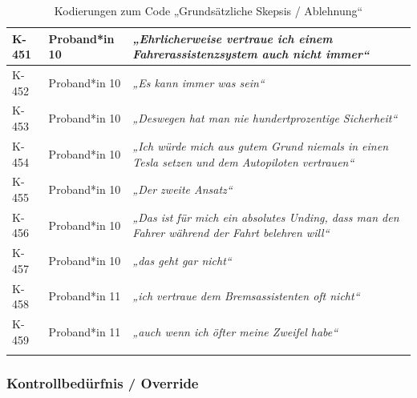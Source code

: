 {\begin{xltabular}{\textwidth}{
    |P{0.10\textwidth}
    |P{0.17\textwidth}
    |Y|
}
\hline
K-451 & Proband*in 10 & \textit{„Ehrlicherweise vertraue ich einem Fahrerassistenzsystem auch nicht immer“} \\
\hline
K-452 & Proband*in 10 & \textit{„Es kann immer was sein“} \\
\hline
K-453 & Proband*in 10 & \textit{„Deswegen hat man nie hundertprozentige Sicherheit“} \\
\hline
K-454 & Proband*in 10 & \textit{„Ich würde mich aus gutem Grund niemals in einen Tesla setzen und dem Autopiloten vertrauen“} \\
\hline
K-455 & Proband*in 10 & \textit{„Der zweite Ansatz“} \\
\hline
K-456 & Proband*in 10 & \textit{„Das ist für mich ein absolutes Unding, dass man den Fahrer während der Fahrt belehren will“} \\
\hline
K-457 & Proband*in 10 & \textit{„das geht gar nicht“} \\
\hline
K-458 & Proband*in 11 & \textit{„ich vertraue dem Bremsassistenten oft nicht“} \\
\hline
K-459 & Proband*in 11 & \textit{„auch wenn ich öfter meine Zweifel habe“} \\
\hline
\caption{Kodierungen zum Code „Grundsätzliche Skepsis / Ablehnung“}\label{tab:kodiernachweis-grundsaetzliche-skepsis-ablehnung}\\
\end{xltabular}
}

\clearpage
\subsubsection{Kontrollbedürfnis / Override}

